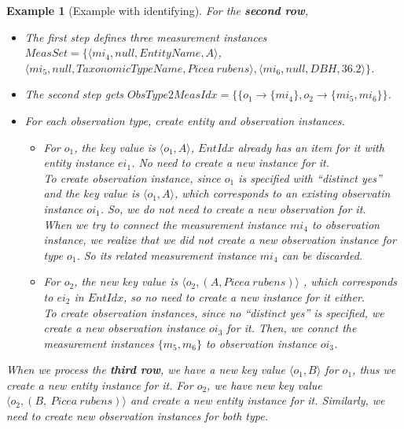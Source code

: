\documentclass[10pt]{article}
\newtheorem{example}{Example}[section]
\begin{document}
\begin{example} [Example with identifying]
For the {\bf second row}, 
\begin{itemize} 
\item The first step defines three measurement instances $MeasSet=\{\langle mi_4, null, EntityName, A\rangle$, \\
$\langle mi_5, null,TaxonomicTypeName, Picea~rubens\rangle, \langle mi_6, null, DBH, 36.2\rangle\}$.
\item The second step gets $ObsType2MeasIdx = \{\{o_1\rightarrow \{mi_4\}, o_2 \rightarrow \{mi_5, mi_6\}\}$.
\item For each observation type, create entity and observation instances.
\begin{itemize}
\item For $o_1$, the key value is $\langle o_1, A\rangle$, $EntIdx$ already has an item for it with entity instance $ei_1$. No need to create a new instance for it. \\
To create observation instance, since $o_1$ is specified with ``{\em distinct yes}'' and the key value is $\langle o_1,A\rangle$, 
which corresponds to an existing observatin instance $oi_1$. So, we do not need to create a new observation for it.\\
When we try to connect the measurement instance $mi_4$ to observation instance,  we realize that we did not create a new observation instance for type $o_1$. 
So its related measurement instance $mi_4$ can be discarded. 
\item For $o_2$, the new key value is $\langle o_2, (A, Picea~rubens)\rangle$ , which corresponds to $ei_2$ in $EntIdx$, so no need to create a new instance for it either. \\
To create observation instances, since no ``{\em distinct yes}'' is specified, we create a new observation instance $oi_3$ for it.
Then, we connct the measurement instances $\{m_5, m_6\}$ to observation instance $oi_3$.
\end{itemize}
\end{itemize}

When we process the {\bf third row}, we have a new key value $\langle o_1, B\rangle$ for $o_1$, thus we create a new entity instance for it.
For $o_2$, we have new key value $\langle o_2, (B,~Picea~rubens)\rangle$ and create a new entity instance for it. Similarly, we need to create new observation instances for both type.

\end{example}
\end{document}
